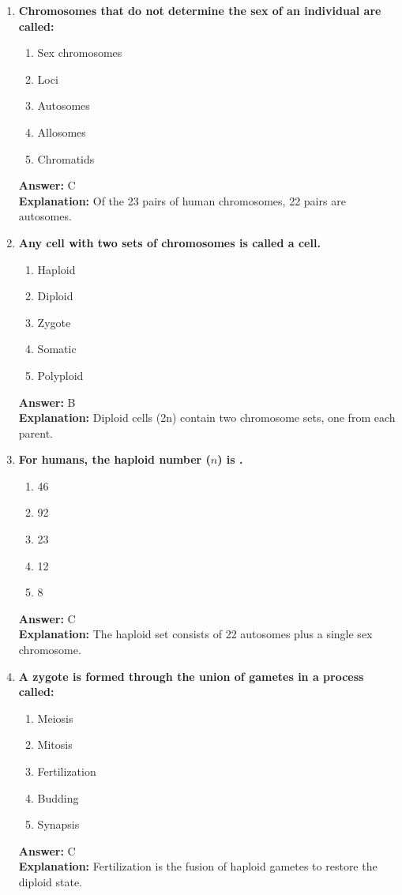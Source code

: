 \documentclass[11pt, a4paper]{article}
\begin{document}
\begin{enumerate}[leftmargin=*, label=\arabic*.]
\item \textbf{Chromosomes that do not determine the sex of an individual are called:}
\begin{enumerate}[label=\Alph*.]
\item Sex chromosomes
\item Loci
\item Autosomes
\item Allosomes
\item Chromatids
\end{enumerate}
\textbf{Answer:} C \\
\textbf{Explanation:} Of the 23 pairs of human chromosomes, 22 pairs are autosomes.

\item \textbf{Any cell with two sets of chromosomes is called a \underline{\hspace{1cm}} cell.}
\begin{enumerate}[label=\Alph*.]
\item Haploid
\item Diploid
\item Zygote
\item Somatic
\item Polyploid
\end{enumerate}
\textbf{Answer:} B \\
\textbf{Explanation:} Diploid cells (2n) contain two chromosome sets, one from each parent.

\item \textbf{For humans, the haploid number ($n$) is \underline{\hspace{1cm}}.}
\begin{enumerate}[label=\Alph*.]
\item 46
\item 92
\item 23
\item 12
\item 8
\end{enumerate}
\textbf{Answer:} C \\
\textbf{Explanation:} The haploid set consists of 22 autosomes plus a single sex chromosome.

\item \textbf{A zygote is formed through the union of gametes in a process called:}
\begin{enumerate}[label=\Alph*.]
\item Meiosis
\item Mitosis
\item Fertilization
\item Budding
\item Synapsis
\end{enumerate}
\textbf{Answer:} C \\
\textbf{Explanation:} Fertilization is the fusion of haploid gametes to restore the diploid state.


\end{enumerate}
\end{document}
